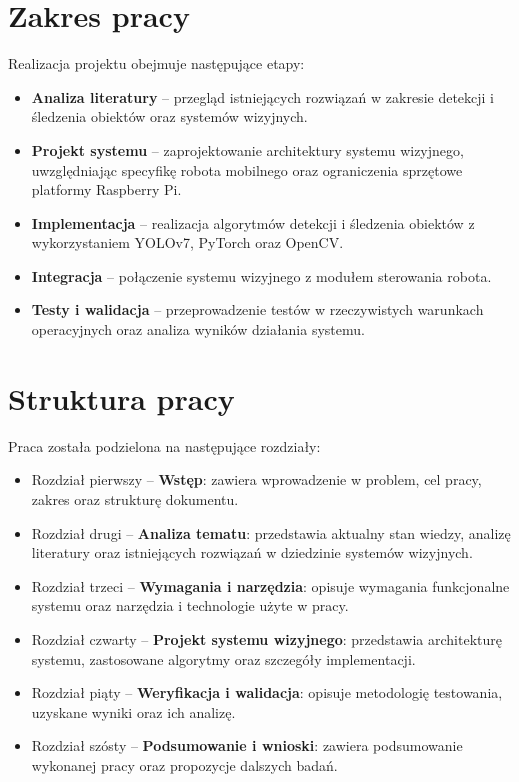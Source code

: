 \documentclass[a4paper,twoside,12pt]{book}
\begin{document}
\section{Zakres pracy}
Realizacja projektu obejmuje następujące etapy:
\begin{itemize}
    \item \textbf{Analiza literatury} – przegląd istniejących rozwiązań w zakresie detekcji i śledzenia obiektów oraz systemów wizyjnych.
    \item \textbf{Projekt systemu} – zaprojektowanie architektury systemu wizyjnego, uwzględniając specyfikę robota mobilnego oraz ograniczenia sprzętowe platformy Raspberry Pi.
    \item \textbf{Implementacja} – realizacja algorytmów detekcji i śledzenia obiektów z wykorzystaniem YOLOv7, PyTorch oraz OpenCV.
    \item \textbf{Integracja} – połączenie systemu wizyjnego z modułem sterowania robota.
    \item \textbf{Testy i walidacja} – przeprowadzenie testów w rzeczywistych warunkach operacyjnych oraz analiza wyników działania systemu.
\end{itemize}

\section{Struktura pracy}
Praca została podzielona na następujące rozdziały:
\begin{itemize}
    \item Rozdział pierwszy – \textbf{Wstęp}: zawiera wprowadzenie w problem, cel pracy, zakres oraz strukturę dokumentu.
    \item Rozdział drugi – \textbf{Analiza tematu}: przedstawia aktualny stan wiedzy, analizę literatury oraz istniejących rozwiązań w dziedzinie systemów wizyjnych.
    \item Rozdział trzeci – \textbf{Wymagania i narzędzia}: opisuje wymagania funkcjonalne systemu oraz narzędzia i technologie użyte w pracy.
    \item Rozdział czwarty – \textbf{Projekt systemu wizyjnego}: przedstawia architekturę systemu, zastosowane algorytmy oraz szczegóły implementacji.
    \item Rozdział piąty – \textbf{Weryfikacja i walidacja}: opisuje metodologię testowania, uzyskane wyniki oraz ich analizę.
    \item Rozdział szósty – \textbf{Podsumowanie i wnioski}: zawiera podsumowanie wykonanej pracy oraz propozycje dalszych badań.
\end{itemize}
\end{document}

